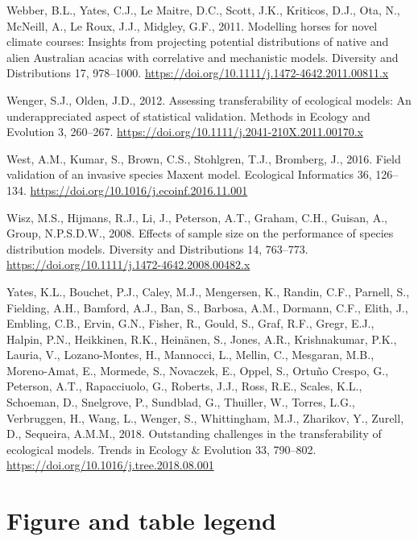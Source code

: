\documentclass[12pt,]{article}
\begin{document}
\begin{CSLReferences}{1}{0}
\leavevmode\hypertarget{ref-Webber2011}{}%
Webber, B.L., Yates, C.J., Le Maitre, D.C., Scott, J.K., Kriticos, D.J.,
Ota, N., McNeill, A., Le Roux, J.J., Midgley, G.F., 2011. Modelling
horses for novel climate courses: Insights from projecting potential
distributions of native and alien {Australian} acacias with correlative
and mechanistic models. Diversity and Distributions 17, 978--1000.
\url{https://doi.org/10.1111/j.1472-4642.2011.00811.x}

\leavevmode\hypertarget{ref-Wenger2012}{}%
Wenger, S.J., Olden, J.D., 2012. Assessing transferability of ecological
models: An underappreciated aspect of statistical validation. Methods in
Ecology and Evolution 3, 260--267.
\url{https://doi.org/10.1111/j.2041-210X.2011.00170.x}

\leavevmode\hypertarget{ref-West2016}{}%
West, A.M., Kumar, S., Brown, C.S., Stohlgren, T.J., Bromberg, J., 2016.
Field validation of an invasive species {Maxent} model. Ecological
Informatics 36, 126--134.
\url{https://doi.org/10.1016/j.ecoinf.2016.11.001}

\leavevmode\hypertarget{ref-Wisz2008}{}%
Wisz, M.S., Hijmans, R.J., Li, J., Peterson, A.T., Graham, C.H., Guisan,
A., Group, N.P.S.D.W., 2008. Effects of sample size on the performance
of species distribution models. Diversity and Distributions 14,
763--773. \url{https://doi.org/10.1111/j.1472-4642.2008.00482.x}

\leavevmode\hypertarget{ref-Yates2018}{}%
Yates, K.L., Bouchet, P.J., Caley, M.J., Mengersen, K., Randin, C.F.,
Parnell, S., Fielding, A.H., Bamford, A.J., Ban, S., Barbosa, A.M.,
Dormann, C.F., Elith, J., Embling, C.B., Ervin, G.N., Fisher, R., Gould,
S., Graf, R.F., Gregr, E.J., Halpin, P.N., Heikkinen, R.K., Heinänen,
S., Jones, A.R., Krishnakumar, P.K., Lauria, V., Lozano-Montes, H.,
Mannocci, L., Mellin, C., Mesgaran, M.B., Moreno-Amat, E., Mormede, S.,
Novaczek, E., Oppel, S., Ortuño Crespo, G., Peterson, A.T., Rapacciuolo,
G., Roberts, J.J., Ross, R.E., Scales, K.L., Schoeman, D., Snelgrove,
P., Sundblad, G., Thuiller, W., Torres, L.G., Verbruggen, H., Wang, L.,
Wenger, S., Whittingham, M.J., Zharikov, Y., Zurell, D., Sequeira,
A.M.M., 2018. Outstanding challenges in the transferability of
ecological models. Trends in Ecology \& Evolution 33, 790--802.
\url{https://doi.org/10.1016/j.tree.2018.08.001}

\end{CSLReferences}

\newpage

\hypertarget{figure-and-table-legend}{%
\section{Figure and table legend}\label{figure-and-table-legend}}
\end{document}

